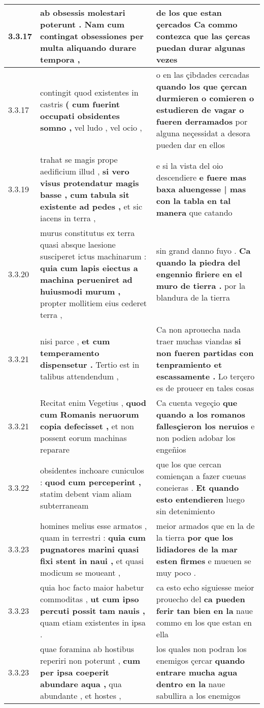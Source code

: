 \begin{tabular}{|p{1cm}|p{6.5cm}|p{6.5cm}|}
3.3.17 & ab obsessis molestari poterunt . \textbf{ Nam cum contingat obsessiones } per multa aliquando durare tempora , & de los que estan çercados \textbf{ Ca commo contezca } que las çercas puedan durar algunas vezes \\\hline
3.3.17 & contingit quod existentes in castris \textbf{ ( cum fuerint occupati obsidentes somno , } vel ludo , vel ocio , & o en las çibdades cercadas \textbf{ quando los que çercan durmieren o comieren o estudieren de vagar o fueren derramados } por alguna neçessidat a desora pueden dar en ellos \\\hline
3.3.19 & trahat se magis prope aedificium illud , \textbf{ si vero visus protendatur magis basse , cum tabula sit existente ad pedes , } et sic iacens in terra , & e si la vista del oio descendiere \textbf{ e fuere mas baxa aluengesse | mas con la tabla en tal manera } que catando \\\hline
3.3.20 & murus constitutus ex terra quasi absque laesione susciperet ictus machinarum : \textbf{ quia cum lapis eiectus a machina perueniret ad huiusmodi murum , } propter mollitiem eius cederet terra , & sin grand danno fuyo . \textbf{ Ca quando la piedra del engennio firiere en el muro de tierra . } por la blandura de la tierra \\\hline
3.3.21 & nisi parce , \textbf{ et cum temperamento dispensetur . } Tertio est in talibus attendendum , & Ca non aprouecha nada traer muchas viandas \textbf{ si non fueren partidas con tenpramiento et escassamente . } Lo terçero es de proueer en tales cosas \\\hline
3.3.21 & Recitat enim Vegetius , \textbf{ quod cum Romanis neruorum copia defecisset , } et non possent eorum machinas reparare & Ca cuenta vegeçio \textbf{ que quando a los romanos fallesçieron los neruios } e non podien adobar los engeñios \\\hline
3.3.22 & obsidentes inchoare cuniculos : \textbf{ quod cum perceperint , } statim debent viam aliam subterraneam & que los que cercan comiençan a fazer cueuas coneieras . \textbf{ Et quando esto entendieren } luego sin detenimiento \\\hline
3.3.23 & homines melius esse armatos , quam in terrestri : \textbf{ quia cum pugnatores marini quasi fixi stent in naui , } et quasi modicum se moueant , & meior armados que en la de la tierra \textbf{ por que los lidiadores de la mar esten firmes } e mueuen se muy poco . \\\hline
3.3.23 & quia hoc facto maior habetur commoditas , \textbf{ ut cum ipso percuti possit tam nauis , } quam etiam existentes in ipsa . & ca esto echo siguiesse meior prouecho del \textbf{ ca pueden ferir tan bien en la } naue commo en los que estan en ella \\\hline
3.3.23 & quae foramina ab hostibus reperiri non poterunt , \textbf{ cum per ipsa coeperit abundare aqua , } qua abundante , et hostes , & los quales non podran los enemigos çercar \textbf{ quando entrare mucha agua dentro en la } naue sabullira a los enemigos \\\hline

\end{tabular}
